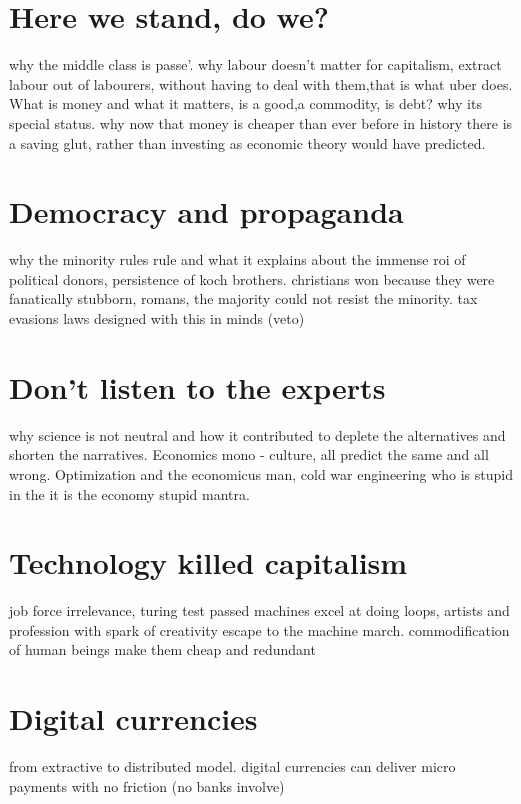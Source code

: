 \documentclass[11pt, onecolumn]{article}
\begin{document}
\section{Here we stand, do we?}
\label{se:hisacc}
why the middle class is passe'.
why labour doesn't matter for capitalism, extract labour out of labourers, without having to deal with them,that is what uber does.
What is money and what it matters, is a good,a commodity, is debt? why its special status.
why now that money is cheaper than ever before in history there is a saving glut, rather than investing as economic theory would have predicted.

\section{Democracy and propaganda}
\label{se:hisacc}
why the minority rules rule and what it explains about the immense roi of political donors, persistence of koch brothers. christians won because they were fanatically stubborn, romans, the majority could not resist the minority. 
tax evasions laws designed with this in minds (veto)


\section{Don't listen to the experts}
\label{se:hisacc}
why science is not neutral and how it contributed to deplete the alternatives and shorten the narratives.
Economics mono - culture, all predict the same and all wrong.
Optimization and the economicus man, cold war engineering
who is stupid in the it is the economy stupid mantra.

\section{Technology killed capitalism}
\label{se:hisacc}
job force irrelevance, turing test passed
machines excel at doing loops, artists and profession with spark of creativity escape to the machine march.
commodification of human beings make them cheap and redundant

\section{Digital currencies}
\label{se:hisacc}
from extractive to distributed model.
digital currencies can deliver micro payments with no friction (no banks involve)
\end{document}
